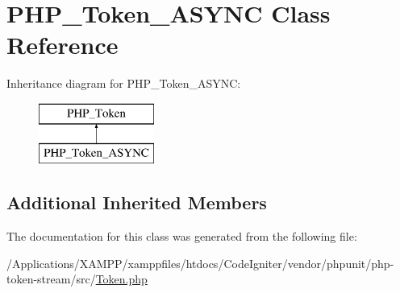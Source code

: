 \hypertarget{class_p_h_p___token___a_s_y_n_c}{}\section{P\+H\+P\+\_\+\+Token\+\_\+\+A\+S\+Y\+NC Class Reference}
\label{class_p_h_p___token___a_s_y_n_c}
Inheritance diagram for P\+H\+P\+\_\+\+Token\+\_\+\+A\+S\+Y\+NC\+:\begin{figure}[H]
\begin{center}
\leavevmode
\includegraphics[height=2.000000cm]{class_p_h_p___token___a_s_y_n_c}
\end{center}
\end{figure}
\subsection*{Additional Inherited Members}


The documentation for this class was generated from the following file\+:\begin{DoxyCompactItemize}
\item 
/\+Applications/\+X\+A\+M\+P\+P/xamppfiles/htdocs/\+Code\+Igniter/vendor/phpunit/php-\/token-\/stream/src/\mbox{\hyperlink{_token_8php}{Token.\+php}}\end{DoxyCompactItemize}
